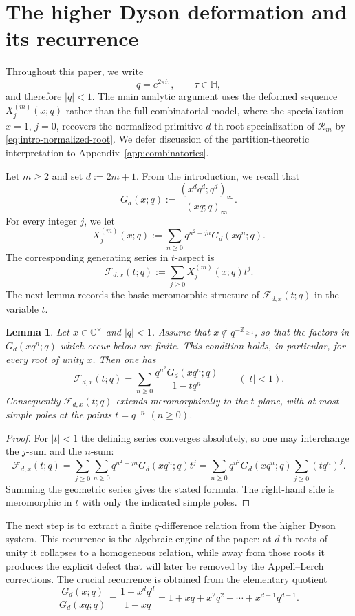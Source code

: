 \documentclass[12pt]{amsart}
\numberwithin{equation}{section}
\newtheorem{lemma}[theorem]{Lemma}
\newcommand{\CC}{\mathbb C}
\newcommand{\HH}{\mathbb H}
\newcommand{\ZZ}{\mathbb Z}
\newcommand{\RRm}{\mathcal R}
\begin{document}
\section{The higher Dyson deformation and its recurrence}

Throughout this paper, we write
\[
q=e^{2\pi i\tau},\qquad \tau\in\HH,
\]
and therefore $|q|<1$.
The main analytic argument uses the deformed sequence \(X_j^{(m)}(x;q)\)
rather than the full combinatorial model, where  the specialization \(x=1\),
\(j=0\), recovers the normalized primitive \(d\)-th-root specialization of
\(\RRm_m\) by \eqref{eq:intro-normalized-root}. We defer discussion of the partition-theoretic
interpretation to Appendix~\ref{app:combinatorics}.

Let $m\geq 2$ and set $d:=2m+1$.  From the introduction, we recall that
\[
G_d(x;q):=\frac{(x^dq^d;q^d)_\infty}{(xq;q)_\infty}.
\]
For every integer $j$, we let
\[
X_j^{(m)}(x;q):=\sum_{n\geq 0} q^{n^2+jn}G_d(xq^n;q).
\]
The corresponding generating series  in $t$-aspect is
\[
\mathcal F_{d,x}(t;q):=\sum_{j\geq 0} X_j^{(m)}(x;q)t^j.
\]
The next lemma records the basic meromorphic structure of $\mathcal F_{d,x}(t;q)$ in the variable $t$.

\begin{lemma}\label{lem:F-meromorphic}
Let $x\in\CC^\times$ and $|q|<1$.  Assume that
$x\notin q^{-\ZZ_{\geq 1}}$, so that the factors in
$G_d(xq^n;q)$ which occur below are finite.  This condition holds, in
particular, for every root of unity $x$.  Then one has
\[
\mathcal F_{d,x}(t;q)
=
\sum_{n\geq 0}\frac{q^{n^2}G_d(xq^n;q)}{1-tq^n}
\qquad (|t|<1).
\]
Consequently $\mathcal F_{d,x}(t;q)$ extends meromorphically to the $t$-plane, with at most simple poles at the points $t=q^{-n}$ $(n\geq 0)$.
\end{lemma}

\begin{proof}
For $|t|<1$ the defining series converges absolutely, so one may interchange the $j$-sum and the $n$-sum:
\[
\mathcal F_{d,x}(t;q)
=
\sum_{j\geq 0}\sum_{n\geq 0} q^{n^2+jn}G_d(xq^n;q)t^j
=
\sum_{n\geq 0} q^{n^2}G_d(xq^n;q)\sum_{j\geq 0}(tq^n)^j.
\]
Summing the geometric series gives the stated formula.  The right-hand side is meromorphic in $t$ with only the indicated simple poles.
\end{proof}

The next step is to extract a finite \(q\)-difference relation from the higher
Dyson system.  This recurrence is the algebraic engine of the paper: at
\(d\)-th roots of unity it collapses to a homogeneous relation, while away from
those roots it produces the explicit defect that will later be removed by the
Appell--Lerch corrections.
The crucial recurrence is obtained from the elementary quotient
\[
\frac{G_d(x;q)}{G_d(xq;q)}=\frac{1-x^dq^d}{1-xq}=1+xq+x^2q^2+\cdots+x^{d-1}q^{d-1}.
\]
\end{document}
